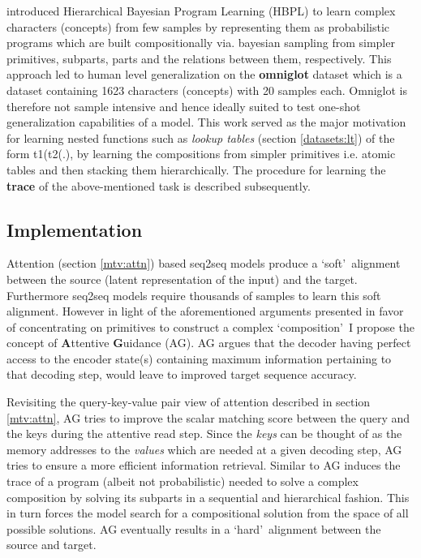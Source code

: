\cite{Lake2015} introduced Hierarchical Bayesian Program Learning (HBPL) to learn complex characters (concepts) from few samples by representing them as probabilistic programs which are built compositionally via. bayesian sampling from simpler primitives, subparts, parts and the relations between them, respectively. This approach led to human level generalization on the \textbf{omniglot} dataset \citep{Lake2015} which is a dataset containing 1623 characters (concepts) with 20 samples each. Omniglot is therefore not sample intensive and hence ideally suited to test one-shot generalization capabilities of a model. This work served as the major motivation for learning nested functions such as \textit{lookup tables} (section \ref{datasets:lt}) of the form t1(t2(.), by learning the compositions from simpler primitives i.e. atomic tables and then stacking them hierarchically. The procedure for learning the \textbf{trace} of the above-mentioned task is described subsequently.

\subsection{Implementation}

Attention (section \ref{mtv:attn}) based seq2seq models produce a \lq soft{}\rq\ alignment between the source (latent representation of the input) and the target. Furthermore seq2seq models require thousands of samples to learn this soft alignment. However in light of the aforementioned arguments presented in favor of concentrating on primitives to construct a complex \lq composition{}\rq\ I propose the concept of \textbf{A}ttentive \textbf{G}uidance (AG). AG argues that the decoder having perfect access to the encoder state(s) containing maximum information pertaining to that decoding step, would leave to improved target sequence accuracy.


Revisiting the query-key-value pair view of attention described in section \ref{mtv:attn}, AG tries to improve the scalar matching score between the query and the keys during the attentive read step. Since the \textit{keys} can be thought of as the memory addresses to the \textit{values} which are needed at a given decoding step, AG tries to ensure a more efficient information retrieval. Similar to \cite{Lake2015} AG induces the trace of a program (albeit not probabilistic) needed to solve a complex composition by solving its subparts in a sequential and hierarchical fashion. This in turn forces the model search for a compositional solution from the space of all possible solutions. AG eventually results in a \lq hard{}\rq\ alignment between the source and target.


